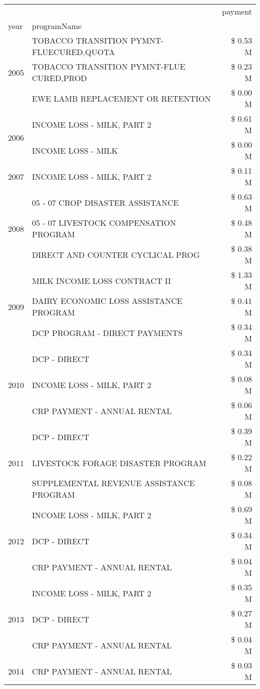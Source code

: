 \begin{tabular}{llr}
\toprule
 &  & payment \\
year & programName &  \\
\midrule
\multirow[t]{3}{*}{2005} & TOBACCO TRANSITION PYMNT-FLUECURED,QUOTA & \$ 0.53 M \\
 & TOBACCO TRANSITION PYMNT-FLUE CURED,PROD & \$ 0.23 M \\
 & EWE LAMB REPLACEMENT OR RETENTION & \$ 0.00 M \\
\cline{1-3}
\multirow[t]{2}{*}{2006} & INCOME LOSS - MILK, PART 2 & \$ 0.61 M \\
 & INCOME LOSS - MILK & \$ 0.00 M \\
\cline{1-3}
2007 & INCOME LOSS - MILK, PART 2 & \$ 0.11 M \\
\cline{1-3}
\multirow[t]{3}{*}{2008} & 05 - 07 CROP DISASTER ASSISTANCE & \$ 0.63 M \\
 & 05 - 07 LIVESTOCK COMPENSATION PROGRAM & \$ 0.48 M \\
 & DIRECT AND COUNTER CYCLICAL PROG & \$ 0.38 M \\
\cline{1-3}
\multirow[t]{3}{*}{2009} & MILK INCOME LOSS CONTRACT II & \$ 1.33 M \\
 & DAIRY ECONOMIC LOSS ASSISTANCE PROGRAM & \$ 0.41 M \\
 & DCP PROGRAM - DIRECT PAYMENTS & \$ 0.34 M \\
\cline{1-3}
\multirow[t]{3}{*}{2010} & DCP - DIRECT & \$ 0.34 M \\
 & INCOME LOSS - MILK, PART 2 & \$ 0.08 M \\
 & CRP PAYMENT - ANNUAL RENTAL & \$ 0.06 M \\
\cline{1-3}
\multirow[t]{3}{*}{2011} & DCP - DIRECT & \$ 0.39 M \\
 & LIVESTOCK FORAGE DISASTER PROGRAM & \$ 0.22 M \\
 & SUPPLEMENTAL REVENUE ASSISTANCE PROGRAM & \$ 0.08 M \\
\cline{1-3}
\multirow[t]{3}{*}{2012} & INCOME LOSS - MILK, PART 2 & \$ 0.69 M \\
 & DCP - DIRECT & \$ 0.34 M \\
 & CRP PAYMENT - ANNUAL RENTAL & \$ 0.04 M \\
\cline{1-3}
\multirow[t]{3}{*}{2013} & INCOME LOSS - MILK, PART 2 & \$ 0.35 M \\
 & DCP - DIRECT & \$ 0.27 M \\
 & CRP PAYMENT - ANNUAL RENTAL & \$ 0.04 M \\
\cline{1-3}
\multirow[t]{3}{*}{2014} & CRP PAYMENT - ANNUAL RENTAL & \$ 0.03 M \\

\end{tabular}
